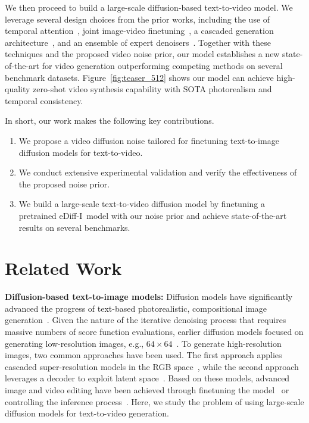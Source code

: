 \documentclass[10pt,twocolumn,letterpaper]{article}
\newcommand{\ediffi}{eDiff-I\xspace}
\begin{document}
We then proceed to build a large-scale diffusion-based text-to-video model. We leverage several design choices from the prior works, including the use of temporal attention~\cite{ho2022video}, joint image-video finetuning~\cite{ho2022video}, a cascaded generation architecture~\cite{ho2022imagen}, and an ensemble of
expert denoisers~\cite{balaji2022ediffi}. Together with these techniques and the proposed video noise prior, our model establishes a new state-of-the-art for video generation outperforming competing methods on several benchmark datasets. Figure~\ref{fig:teaser_512} shows our model can achieve high-quality zero-shot video synthesis capability with SOTA photorealism and temporal consistency.

In short, our work makes the following key contributions.

\begin{enumerate}[leftmargin=8pt]
    \setlength\itemsep{0em}
    \item We propose a video diffusion noise tailored for finetuning text-to-image diffusion models for text-to-video.
    \item We conduct extensive experimental validation and verify the effectiveness of the proposed noise prior.
    \item We build a large-scale text-to-video diffusion model by finetuning a pretrained \ediffi~model with our noise prior and achieve state-of-the-art results on several benchmarks.
\end{enumerate}

 
\section{Related Work}\label{sec:related_work}


\textbf{Diffusion-based text-to-image models: } Diffusion models have significantly advanced the progress of text-based photorealistic, compositional image generation~\cite{ramesh2022hierarchical,saharia2022photorealistic}. Given the nature of the iterative denoising process that requires massive numbers of score function evaluations, earlier diffusion models focused on generating low-resolution images, e.g., $64\times64$~\cite{ho2020denoising,song2021denoising}. To generate high-resolution images, two common approaches have been used. The first approach applies cascaded super-resolution models in the RGB space~\cite{nichol2021glide,ho2022cascaded,saharia2022photorealistic,ramesh2022hierarchical}, while the second approach leverages a decoder to exploit latent space~\cite{rombach2022high,gu2022vector}. Based on these models, advanced image and video editing have been achieved through finetuning the model~\cite{ruiz2022dreambooth,zhang2023adding,brooks2022instructpix2pix,kumari2022multi,wu2022tune,ma2023follow} or controlling the inference process~\cite{meng2022sdedit,hertz2022prompt,parmar2023zero,ge2023expressive,qi2023fatezero,ceylan2023pix2video,molad2023dreamix,bar2022text2live}. Here, we study the problem of using large-scale diffusion models for text-to-video generation. 
\end{document}
